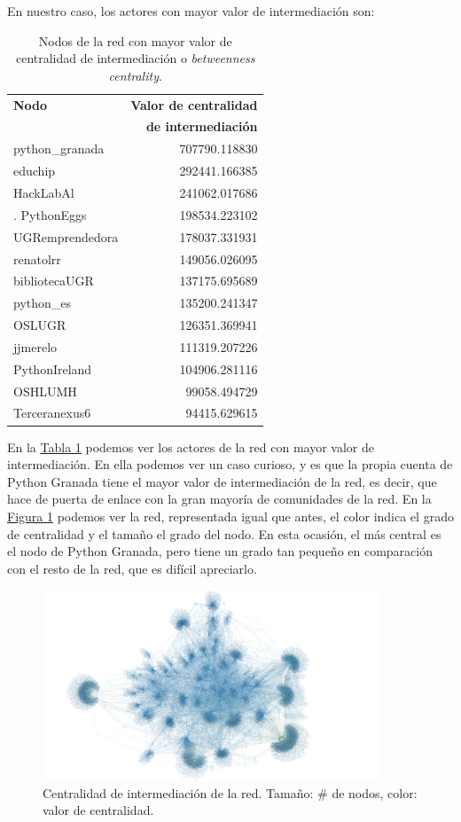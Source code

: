 \documentclass[paper=a4, fontsize=11pt]{article} %
\numberwithin{equation}{section} %
\numberwithin{figure}{section} %
\numberwithin{table}{section} %
\begin{document}
En nuestro caso, los actores con mayor valor de intermediación son:

\begin{table}[H]
\begin{tabular}{l|r}
\textbf{Nodo} & \textbf{Valor de centralidad} \\
& \textbf{de intermediación}\\
\hline
python\_granada & 707790.118830 \\
educhip & 292441.166385 \\
HackLabAl & 241062.017686 \\.
PythonEggs & 198534.223102 \\
UGRemprendedora & 178037.331931 \\
renatolrr & 149056.026095 \\
bibliotecaUGR & 137175.695689 \\
python\_es & 135200.241347 \\
OSLUGR & 126351.369941 \\
jjmerelo & 111319.207226 \\
PythonIreland & 104906.281116 \\
OSHLUMH & 99058.494729 \\
Terceranexus6 & 94415.629615 \\
\end{tabular}
\label{between}
\caption{Nodos de la red con mayor valor de centralidad de intermediación o \textit{betweenness centrality}.}
\end{table}

En la \hyperref[between]{Tabla \ref*{between}} podemos ver los actores de la red con mayor valor de intermediación. En ella podemos ver un caso curioso, y es que la propia cuenta de Python Granada tiene el mayor valor de intermediación de la red, es decir, que hace de puerta de enlace con la gran mayoría de comunidades de la red. En la \hyperref[im5]{Figura \ref*{im5}} podemos ver la red, representada igual que antes, el color indica el grado de centralidad y el tamaño el grado del nodo. En esta ocasión, el más central es el nodo de Python Granada, pero tiene un grado tan pequeño en comparación con el resto de la red, que es difícil apreciarlo.
\begin{figure}[H]
  \centering
  \includegraphics[width=0.9\textwidth]{Visualizaciones/between}
  \caption{Centralidad de intermediación de la red. Tamaño: \# de nodos, color: valor de centralidad.}
  \label{im5}
\end{figure}
\end{document}
